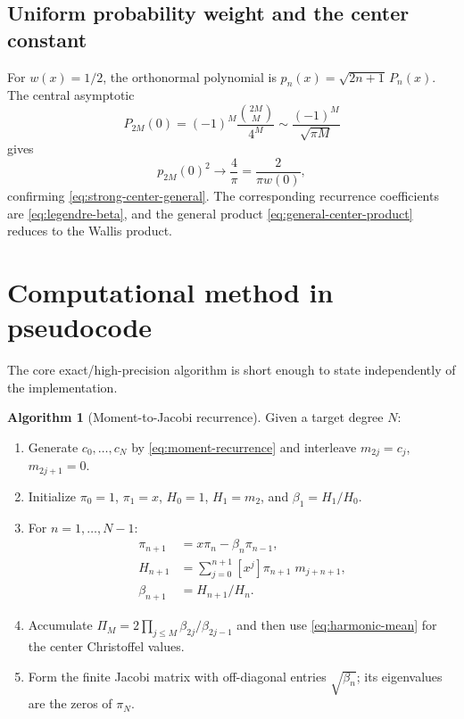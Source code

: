 \documentclass[11pt,oneside]{article}
\theoremstyle{definition}
\newtheorem{algorithm}[theorem]{Algorithm}
\theoremstyle{remark}
\numberwithin{equation}{section}
\begin{document}
\subsection{Uniform probability weight and the center constant}
For $w(x)=1/2$, the orthonormal polynomial is
$p_n(x)=\sqrt{2n+1}\,P_n(x)$.  The central asymptotic
\begin{equation}
 P_{2M}(0)=(-1)^M\frac{\binom{2M}{M}}{4^M}
 \sim\frac{(-1)^M}{\sqrt{\pi M}}
 \label{eq:legendre-center-check}
\end{equation}
gives
\begin{equation}
 p_{2M}(0)^2\longrightarrow\frac4\pi
 =\frac{2}{\pi w(0)},
 \label{eq:center-constant-check}
\end{equation}
confirming \cref{eq:strong-center-general}.  The corresponding recurrence
coefficients are \cref{eq:legendre-beta}, and the general product
\cref{eq:general-center-product} reduces to the Wallis product.

\section{Computational method in pseudocode}
\label{app:pseudocode}

The core exact/high-precision algorithm is short enough to state independently
of the implementation.

\begin{algorithm}[Moment-to-Jacobi recurrence]
Given a target degree $N$:
\begin{enumerate}
\item Generate $c_0,\ldots,c_N$ by \cref{eq:moment-recurrence} and interleave
      $m_{2j}=c_j$, $m_{2j+1}=0$.
\item Initialize
      $\pi_0=1$, $\pi_1=x$, $H_0=1$, $H_1=m_2$, and
      $\beta_1=H_1/H_0$.
\item For $n=1,\ldots,N-1$:
      \begin{align*}
       \pi_{n+1}&=x\pi_n-\beta_n\pi_{n-1},\\
       H_{n+1}&=\sum_{j=0}^{n+1}[x^j]\pi_{n+1}\;m_{j+n+1},\\
       \beta_{n+1}&=H_{n+1}/H_n.
      \end{align*}
\item Accumulate
      $\Pi_M=2\prod_{j\le M}\beta_{2j}/\beta_{2j-1}$ and then use
      \cref{eq:harmonic-mean} for the center Christoffel values.
\item Form the finite Jacobi matrix with off-diagonal entries
      $\sqrt{\beta_n}$; its eigenvalues are the zeros of $\pi_N$.
\end{enumerate}
\end{algorithm}
\end{document}
